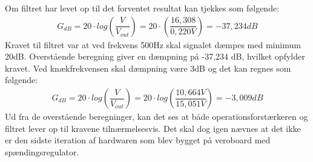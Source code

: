 Om filtret har levet op til det forventet resultat kan tjekkes som følgende:
\begin{align}
G_{dB}=20\cdot log\left(\dfrac{V}{V_{out}}\right)=20\cdot \left(\dfrac{16,308}{0,220V}\right)=-37,234dB
\end{align}
Kravet til filtret var at ved frekvens 500Hz skal signalet dæmpes med minimum 20dB. Overstående beregning giver en dæmpning på -37,234 dB, hvilket opfylder kravet. Ved knækfrekvensen skal dæmpning være 3dB og det kan regnes som følgende: 
\begin{align}
G_{dB}=20\cdot log\left(\dfrac{V}{V_{out}}\right) = 20\cdot log\left(\dfrac{10,664V}{15,051V}\right)=-3,009dB
\end{align}
Ud fra de overstående beregninger, kan det ses at både operationsforstærkeren og filtret lever op til kravene tilnærmelsesvis. Det skal dog igen nævnes at det ikke er den sidste iteration af hardwaren som blev bygget på veroboard med spændingsregulator.
